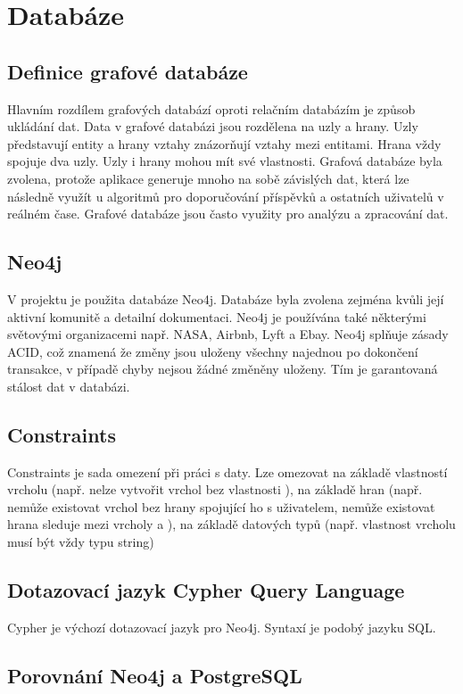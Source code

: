 \documentclass[12pt, a4paper,
 twoside,        %
 openright
]{report}
\begin{document}
    \section{Databáze}
    \subsection{Definice grafové databáze}
        Hlavním rozdílem grafových databází oproti relačním databázím je způsob ukládání dat. 
        Data v grafové databázi jsou rozdělena na uzly a hrany. Uzly představují entity a hrany vztahy znázorňují vztahy mezi entitami. Hrana vždy spojuje dva uzly.
        Uzly i hrany mohou mít své vlastnosti. Grafová databáze byla zvolena, protože aplikace generuje mnoho na sobě závislých dat, která
        lze následně využít u algoritmů pro doporučování příspěvků a ostatních uživatelů v reálném čase. Grafové databáze jsou často využity pro analýzu a zpracování dat.
    \subsection{Neo4j}
        V projektu je použita databáze Neo4j. Databáze byla zvolena zejména kvůli její aktivní komunitě a detailní dokumentaci. Neo4j je používána také některými světovými organizacemi např. NASA, Airbnb, Lyft a Ebay. Neo4j splňuje zásady ACID, což znamená že změny jsou uloženy všechny najednou po dokončení transakce, v případě chyby nejsou žádné změněny uloženy. Tím je garantovaná stálost dat v databázi.
    \subsection{Constraints}
        Constraints je sada omezení při práci s daty. Lze omezovat na základě vlastností vrcholu (např. nelze vytvořit vrchol  bez vlastnosti ), na základě hran (např. nemůže existovat vrchol  bez hrany  spojující ho s uživatelem, nemůže existovat hrana sleduje mezi vrcholy  a ), na základě datových typů (např. vlastnost  vrcholu  musí být vždy typu string)
    \subsection{Dotazovací jazyk Cypher Query Language}
        Cypher je výchozí dotazovací jazyk pro Neo4j. Syntaxí je podobý jazyku SQL.
    \subsection{Porovnání Neo4j a PostgreSQL}
\end{document}
